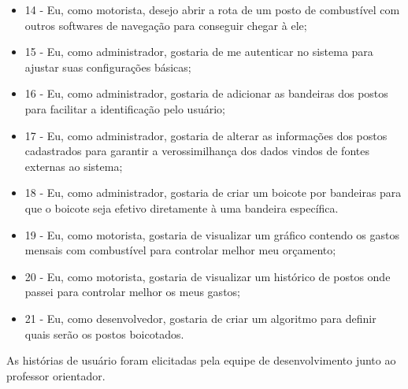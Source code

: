 \begin{itemize}
    \item 14 - Eu, como motorista, desejo abrir a rota de um posto de combustível com outros softwares de navegação para conseguir chegar à ele;
    \item 15 - Eu, como administrador, gostaria de me autenticar no sistema para ajustar suas configurações básicas;
    \item 16 - Eu, como administrador, gostaria de adicionar as bandeiras dos postos para facilitar a identificação pelo usuário;
    \item 17 - Eu, como administrador, gostaria de alterar as informações dos postos cadastrados para garantir a verossimilhança dos dados vindos de fontes externas ao sistema;
    \item 18 - Eu, como administrador, gostaria de criar um boicote por bandeiras para que o boicote seja efetivo diretamente à uma bandeira específica.
    \item 19 - Eu, como motorista, gostaria de visualizar um gráfico contendo os gastos mensais com combustível para controlar melhor meu orçamento;
    \item 20 - Eu, como motorista, gostaria de visualizar um histórico de postos onde passei para controlar melhor os meus gastos;
    \item 21 - Eu, como desenvolvedor, gostaria de criar um algoritmo para definir quais serão os postos boicotados.
\end{itemize}

As histórias de usuário foram elicitadas pela equipe de desenvolvimento junto ao professor orientador.

